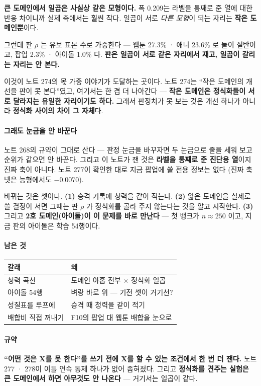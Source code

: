 \documentclass[10pt]{article}
\begin{document}
\textbf{큰 도메인에서 일곱은 사실상 같은 모형이다.} 폭 0.209는 라벨을
통째로 준 열에 대한 반응 차이니까 실제 축에서는 훨씬 작다. 일곱이 서로
\emph{다른 모형}이 되는 자리는 \textbf{작은 도메인뿐}이다.

그런데 판 $\rho$ 는 유보 표본 수로 가중한다 --- 웹툰 27.3\% · 애니 23.6\%
로 둘이 절반이고, 팝업 2.3\% · 아이돌 1.0\% 다. \textbf{판은 일곱이 서로
같은 자리에서 재고, 일곱이 갈리는 자리는 안 본다.}

이것이 노트 274의 몫 가중 이야기가 도달하는 곳이다. 노트 274는 ``작은
도메인의 개선을 판이 못 본다''였고, 여기서는 한 겹 더 나아간다 ---
\textbf{작은 도메인은 정식화들이 서로 달라지는 유일한 자리이기도 하다.}
그래서 판정치가 못 보는 것은 개선 하나가 아니라 \textbf{정식화 사이의 차이
그 자체}다.

\paragraph{그래도 눈금을 안 바꾼다} 노트 268의 규약이 그대로 산다 ---
판정 눈금을 바꾸자면 두 눈금으로 줄을 세워 보고 순위가 같으면 안 바꾼다.
그리고 이 노트가 잰 것은 \textbf{라벨을 통째로 준 진단용 열}이지 진짜
축이 아니다. 노트 277이 확인한 대로 지금 팝업에 쓸 전용 정보는 없다
(진짜 축 넷은 능형에서도 $-$0.0070).

바뀌는 것은 셋이다. \textbf{(1)} 승격 기록에 청력을 같이 적는다.
\textbf{(2)} 얇은 도메인을 실제로 쓸 결정이 서면 그때는 판 $\rho$ 가
정식화를 골라 주지 않는다는 것을 알고 시작한다. \textbf{(3)} 그리고
\textbf{2호 도메인(아이돌)이 이 문제를 바로 만난다} --- 첫 뱅크가
$n{\approx}250$ 이고, 지금 판의 아이돌은 학습 54행이다.

\paragraph{남은 것}
\begin{center}\small
\begin{tabular}{ll}
\hline
갈래 & 왜 \\
\hline
청력 곡선 & 도메인 아홉 전부 $\times$ 정식화 일곱 \\
아이돌 54행 & 벼랑 바로 위 --- 기전 셋이 거기선? \\
성질표를 루프에 & 승격 때 청력을 같이 적기 \\
배합비 직접 꺼내기 & F10의 팝업 대 웹툰 배합을 눈으로 \\
\hline
\end{tabular}
\end{center}

\paragraph{규약} \textbf{``어떤 것은 X를 못 한다''를 쓰기 전에 X를 할 수
있는 조건에서 한 번 더 잰다.} 노트 277 · 278이 이틀 연속 통제 하나가 없어
좁혀졌다. 그리고 \textbf{정식화를 견주는 실험은 큰 도메인에서 하면 아무것도
안 나온다} --- 거기서는 일곱이 같다.
\end{document}
